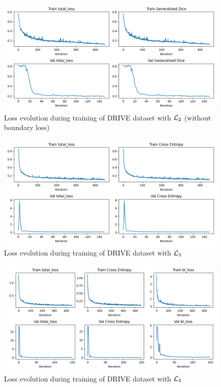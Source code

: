 \begin{figure}[H]
    \centering
    \includegraphics[width=\textwidth]{figures/GDL_learning_curves.png}
    \caption{Loss evolution during training of DRIVE dataset with $\mathcal{L}_2$ (without boundary loss)}
    \label{fig:learn_curve_drive_l2}
\end{figure}

\begin{figure}[H]
    \centering
    \includegraphics[width=\textwidth]{figures/CE_learning_curves.png}
    \caption{Loss evolution during training of DRIVE dataset with $\mathcal{L}_3$}
    \label{fig:learn_drive_l3}
\end{figure}

\begin{figure}[H]
    \centering
    \includegraphics[width=\textwidth]{figures/CEwBL_learning_curves.png}
    \caption{Loss evolution during training of DRIVE dataset with $\mathcal{L}_4$}
    \label{fig:learn_drive_l4}
\end{figure}

